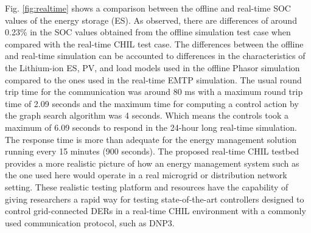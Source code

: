 Fig. \ref{fig:realtime} shows a comparison between the offline and real-time SOC values of the energy storage (ES). As observed, there are differences of around 0.23\%  in the SOC values obtained from the offline simulation test case when compared with the real-time CHIL test case. The differences between the offline and real-time simulation can be accounted to differences in the characteristics of the Lithium-ion ES, PV, and load models used in the offline Phasor simulation compared to the ones used in the real-time EMTP simulation. The usual round trip time for the communication was around 80 ms with a maximum round trip time of 2.09 seconds and the maximum time for computing a control action by the graph search algorithm was 4 seconds. Which means the controls took a maximum of 6.09 seconds to respond in the 24-hour long real-time simulation. The response time is more than adequate for the energy management solution running every 15 minutes (900 seconds). The proposed real-time CHIL testbed provides a more realistic picture of how an energy management system such as the one used here would operate in a real microgrid or distribution network setting. These realistic testing platform and resources have the capability of giving researchers a rapid way for testing state-of-the-art controllers designed to control grid-connected DERs in a real-time CHIL environment with a commonly used communication protocol, such as DNP3.


 



